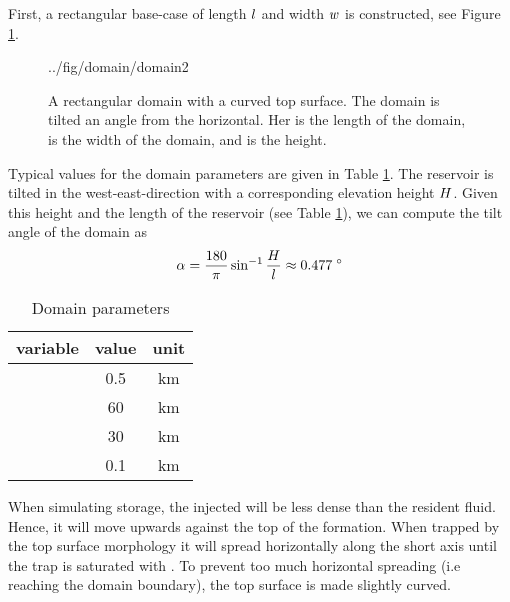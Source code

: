 \documentclass[11pt,a4paper]{amsart}
\newenvironment{ovpc}[2]{\begin{overpic}[width=#1\textwidth]{../fig/#2}}{\end{overpic}}
\begin{document}
First, a rectangular base-case of length $l$ and width
$w$ is constructed, see Figure \ref{fig:dom}.  
\begin{figure}
  \centering
  \begin{ovpc}{.8}{domain/domain2}
  \end{ovpc}
  \caption{A rectangular domain with a curved top surface. The domain is tilted an
  angle \tiltAngle{} from the horizontal. Her \domainLength{} is the length of
  the domain,  \domainWidth{} is the width of the domain, and \domainHeight{} is
  the height. }
  \label{fig:dom}
\end{figure}
Typical values for the domain parameters are given in Table \ref{tab:1}. The
reservoir is tilted in the west-east-direction with a corresponding elevation
height $H$. Given this height and the length of the
reservoir (see Table \ref{tab:1}), we can 
compute the tilt angle \tiltAngle{} of the domain as
\begin{align}
  \label{eq:1}
  \alpha = \frac{180}{\pi}\sin^{-1}\frac{H}{l}
  \approx 0.477\; ^\circ
\end{align}
\begin{table}
  \setlength{\tabcolsep}{12pt}
  \centering
  \begin{tabular}{ccc}
    \toprule
    variable & value & unit  \\
    \midrule
    \domainAngleHeight{} & 0.5 & \unit{km} \\
    \domainLength{} & 60 & \unit{km} \\
    \domainWidth{} & 30 & \unit{km} \\
    \domainHeight{} & 0.1 & \unit{km} \\
    \bottomrule
  \end{tabular}
  \caption{Domain parameters}
  \label{tab:1}
\end{table}
When simulating \cotwo{}
storage, the injected \cotwo{} will be less dense than the resident
fluid. Hence, it will move upwards against
the top of the formation. When trapped by the top surface morphology it
will spread horizontally along the short axis until the trap is saturated
with \cotwo{}. To prevent too much horizontal spreading (i.e \cotwo{} reaching
the domain boundary), the top surface is made slightly curved. 
\end{document}
